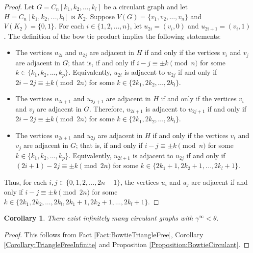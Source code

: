\documentclass[11pt]{article}
\newtheorem{cor}[thm]{Corollary}
\begin{document}
	\begin{proof}
		Let $G = C_{n}[k_1, k_2, ..., k_l]$ be a circulant graph and let $H = C_{n}[k_1, k_2, ..., k_l] \bowtie K_2$. Suppose $V(G)=\{v_1, v_2, \ldots, v_n\}$ and $V(K_2)=\{0, 1\}$. For each $i \in \{1,2,\ldots,n\}$, let $u_{2i}=(v_i,0)$ and $u_{2i+1}=(v_i,1)$. The definition of the bow tie product implies the following statements:
		\begin{itemize}
			\item The vertices $u_{2i}$ and $u_{2j}$ are adjacent in $H$ if and only if the vertices $v_i$ and $v_j$ are adjacent in $G$; that is, if and only if $i-j \equiv \pm k \pmod n$ for some $k \in \{k_1, k_2, \ldots, k_p\}$. Equivalently, $u_{2i}$ is adjacent to $u_{2j}$ if and only if $2i-2j \equiv \pm k \pmod {2n}$ for some $k \in \{2k_1, 2k_2, ..., 2k_l\}$.
			\item The vertices $u_{2i+1}$ and $u_{2j+1}$ are adjacent in $H$ if and only if the vertices $v_i$ and $v_j$ are adjacent in $G$. Therefore, $u_{2i+1}$ is adjacent to $u_{2j+1}$ if and only if $2i-2j \equiv \pm k \pmod {2n}$ for some $k \in \{2k_1, 2k_2, ..., 2k_l\}$.
			\item The vertices $u_{2i+1}$ and $u_{2j}$ are adjacent in $H$ if and only if the vertices $v_i$ and $v_j$ are adjacent in $G$; that is, if and only if $i-j \equiv \pm k \pmod n$ for some $k \in \{k_1, k_2, \ldots, k_p\}$. Equivalently, $u_{2i+1}$ is adjacent to $u_{2j}$ if and only if $(2i+1)-2j \equiv \pm k \pmod {2n}$ for some $k \in \{2k_1+1, 2k_2+1, ..., 2k_l+1\}$.
		\end{itemize}
	Thus, for each $i, j \in \{0,1,2,\ldots,2n-1\}$, the vertices $u_i$ and $u_j$ are adjacent if and only if $i-j \equiv \pm k \pmod {2n}$ for some $k \in \{2k_1, 2k_2, \ldots, 2k_l, 2k_1+1, 2k_2+1, \ldots, 2k_l+1\}$.
	\end{proof}
	
	\begin{cor}
		There exist infinitely many circulant graphs with $\gamma^\infty<\theta$.
	\end{cor}

	\begin{proof}
		This follows from Fact \ref{Fact:BowtieTriangleFree}, Corollary \ref{Corollary:TriangleFreeInfinite} and Proposition \ref{Proposition:BowtieCirculant}.
	\end{proof}

\end{document}
